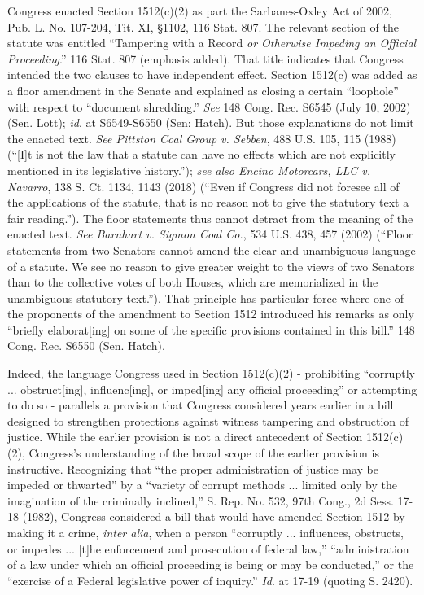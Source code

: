 Congress enacted Section 1512(c)(2) as part the Sarbanes-Oxley Act of 2002, Pub. L. No. 107-204, Tit. XI, \S 1102, 116 Stat. 807.
The relevant section of the statute was entitled “Tampering with a Record \textit{or Otherwise Impeding an Official Proceeding}.”
116 Stat. 807 (emphasis added).
That title indicates that Congress intended the two clauses to have independent effect.
Section 1512(c) was added as a floor amendment in the Senate and explained as closing a certain “loophole” with respect to “document shredding.”
\textit{See} 148 Cong. Rec. S6545 (July 10, 2002) (Sen. Lott);
\textit{id}. at S6549-S6550 (Sen: Hatch).
But those explanations do not limit the enacted text.
\textit{See Pittston Coal Group v. Sebben}, 488 U.S. 105, 115 (1988) (“[I]t is not the law that a statute can have no effects which are not explicitly mentioned in its legislative history.”);
\textit{see also Encino Motorcars, LLC v. Navarro}, 138 S. Ct. 1134, 1143 (2018) (“Even if Congress did not foresee all of the applications of the statute, that is no reason not to give the statutory text a fair reading.”).
The floor statements thus cannot detract from the meaning of the enacted text.
\textit{See Barnhart v. Sigmon Coal Co.}, 534 U.S. 438, 457 (2002) (“Floor statements from two Senators cannot amend the clear and unambiguous language of a statute.
We see no reason to give greater weight to the views of two Senators than to the collective votes of both Houses, which are memorialized in the unambiguous statutory text.”).
That principle has particular force where one of the proponents of the amendment to Section 1512 introduced his remarks as only “briefly elaborat[ing] on some of the specific provisions contained in this bill.”
148 Cong. Rec. S6550 (Sen. Hatch).

Indeed, the language Congress used in Section 1512(c)(2) - prohibiting “corruptly ... obstruct[ing], influenc[ing], or imped[ing] any official proceeding” or attempting to do so -  parallels a provision that Congress considered years earlier in a bill designed to strengthen protections against witness tampering and obstruction of justice.
While the earlier provision is not a direct antecedent of Section 1512(c)(2), Congress’s understanding of the broad scope of the earlier provision is instructive.
Recognizing that “the proper administration of justice may be impeded or thwarted” by a “variety of corrupt methods ... limited only by the imagination of the criminally inclined,” S. Rep. No. 532, 97th Cong., 2d Sess. 17-18 (1982), Congress considered a bill that would have amended Section 1512 by making it a crime, \textit{inter alia}, when a person “corruptly ... influences, obstructs, or impedes ... [t]he enforcement and prosecution of federal law,” “administration of a law under which an official proceeding is being or may be conducted,” or the “exercise of a Federal legislative power of inquiry.” \textit{Id}. at 17-19 (quoting S. 2420).

